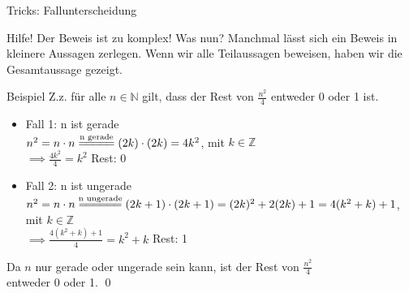 %
%
%
%

\begin{frame}[fragile]{Tricks: Fallunterscheidung}
    \begin{alertblock}{Hilfe! Der Beweis ist zu komplex! Was nun?}
        Manchmal lässt sich ein Beweis in kleinere Aussagen zerlegen. Wenn wir alle Teilaussagen beweisen, haben wir die Gesamtaussage gezeigt.
    \end{alertblock}
    \small\begin{exampleblock}{Beispiel}
        Z.z. für alle $n\in\mathbb{N}$ gilt, dass der Rest von $\frac{n^2}{4}$ entweder 0 oder 1 ist.
        \footnotesize\begin{itemize}
            \item 
                \alert{Fall 1:} n ist gerade\\
                $n^2=n\cdot n\overset{\text{n gerade}}{=\joinrel=\joinrel=\joinrel=\joinrel=}(2k)\cdot(2k) = 4k^2$,  mit $k\in\mathbb{Z}$\\
                $\implies \frac{4k^2}{4} = k^2$ Rest: 0
            \item \alert{Fall 2:} n ist ungerade\\
                $n^2=n\cdot n\overset{\text{n ungerade}}{=\joinrel=\joinrel=\joinrel=\joinrel=\joinrel=}(2k+1)\cdot(2k+1)=(2k)^2+2(2k)+1=4(k^2+k)+1$, \\mit $k\in\mathbb{Z}$\\
                $\implies \frac{4(k^2+k)+1}{4}= k^2+k$ Rest: 1
        \end{itemize}
        Da $n$ nur gerade oder ungerade sein kann, ist der Rest von $\frac{n^2}{4}$ \\entweder 0 oder 1. \qed\;
    \end{exampleblock}
\end{frame}

